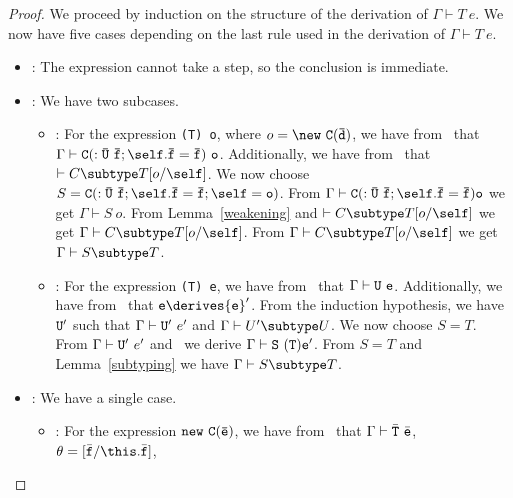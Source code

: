 \begin{proof}
We proceed by induction on the
structure of the derivation of $\Gamma \vdash T\ e$.  We now have five
cases depending on the last rule used in the derivation
of $\Gamma \vdash T\ e$.
\begin{itemize}
\item
\TVar: The expression cannot take a step, so the conclusion is immediate.
\item
\TCast: We have two subcases.
   \begin{itemize}
   \item
   \RCast:  For the expression {\tt (T) o}, where 
            $o = {\tt \new\ {\tt C(\bar{\tt d})}}$,
            we have from \TCast\ that 
            $\Gamma \vdash {\tt C(:\bar{U}\ \bar{\tt f}
                {\tt ;\self.\bar{f}}=\bar{\tt f})\ o}$.
            Additionally, we have from \RCast\ that 
            $\vdash C \subtype T[o/\self]$.
            We now choose 
            $S = {\tt C(:\bar{U}\ \bar{\tt f}
                {\tt ;\self.\bar{f}}=\bar{\tt f}; \self=o)}$.
            From 
            $\Gamma \vdash {\tt C(:\bar{U}\ \bar{\tt f}
                {\tt ;\self.\bar{f}}=\bar{\tt f}) o}$ 
            we get
            $\Gamma \vdash S\ o$.
            From Lemma~\ref{weakening} and $\vdash C \subtype T[o/\self]$ 
            we get 
            $\Gamma \vdash C \subtype T[o/\self]$.
            From $\Gamma \vdash C \subtype T[o/\self]$ we get
            $\Gamma \vdash 
                S \subtype T$.
   \item
   \RCCast: For the expression {\tt (T) e}, we have from \TCast\ that
            $\Gamma \vdash {\tt U}\ {\tt e}$.
            Additionally, we have from \RCCast\ that
            ${\tt e} \derives {{\tt e}}'$.
            From the induction hypothesis, we have ${\tt U}'$ such that
            $\Gamma \vdash {\tt U}'\ e'$ and $\Gamma \vdash U' \subtype U$.
            We now choose $S=T$.
            From $\Gamma \vdash {\tt U}'\ e'$ and \TCast\ we derive
            $\Gamma \vdash {\tt S}\ {\tt (T) e'}$.
            From $S=T$ and Lemma~\ref{subtyping}
            we have $\Gamma \vdash S \subtype T$.
   \end{itemize}
\item
\TNew: We have a single case.
   \begin{itemize}
   \item
   \RCNewArg: For the expression ${\tt new\ C(\bar{e})}$,
            we have from \TNew\ that
            $\Gamma \vdash \bar{\tt T}\ \bar{\tt e}$,
            $\theta=[\bar{\tt f}/\this.\bar{\tt f}]$,

\end{itemize}
\end{itemize}
\end{proof}
